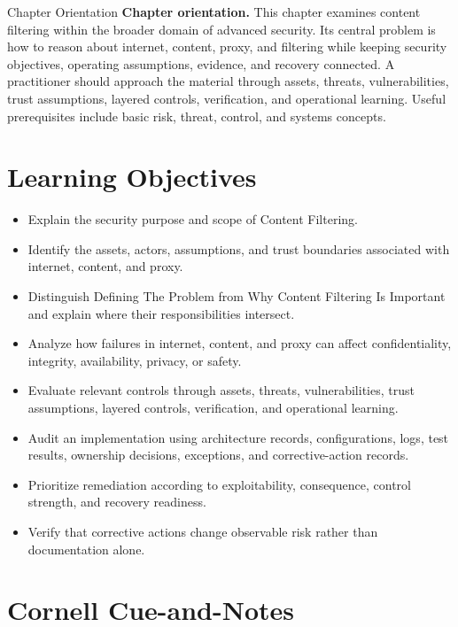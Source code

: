 \documentclass[11pt,letterpaper]{article}
\title{\CornellDocumentTitle}
\author{}
\date{}
\begin{document}
\maketitle
\begin{CornellOverviewBox}{Chapter Orientation}
\textbf{Chapter orientation.} This chapter examines content filtering within the broader domain of advanced security. Its central problem is how to reason about internet, content, proxy, and filtering while keeping security objectives, operating assumptions, evidence, and recovery connected. A practitioner should approach the material through assets, threats, vulnerabilities, trust assumptions, layered controls, verification, and operational learning. Useful prerequisites include basic risk, threat, control, and systems concepts.
\end{CornellOverviewBox}
\section*{Learning Objectives}
\begin{itemize}
\item Explain the security purpose and scope of Content Filtering.
\item Identify the assets, actors, assumptions, and trust boundaries associated with internet, content, and proxy.
\item Distinguish Defining The Problem from Why Content Filtering Is Important and explain where their responsibilities intersect.
\item Analyze how failures in internet, content, and proxy can affect confidentiality, integrity, availability, privacy, or safety.
\item Evaluate relevant controls through assets, threats, vulnerabilities, trust assumptions, layered controls, verification, and operational learning.
\item Audit an implementation using architecture records, configurations, logs, test results, ownership decisions, exceptions, and corrective-action records.
\item Prioritize remediation according to exploitability, consequence, control strength, and recovery readiness.
\item Verify that corrective actions change observable risk rather than documentation alone.
\end{itemize}
\section*{Cornell Cue-and-Notes}
\end{document}
